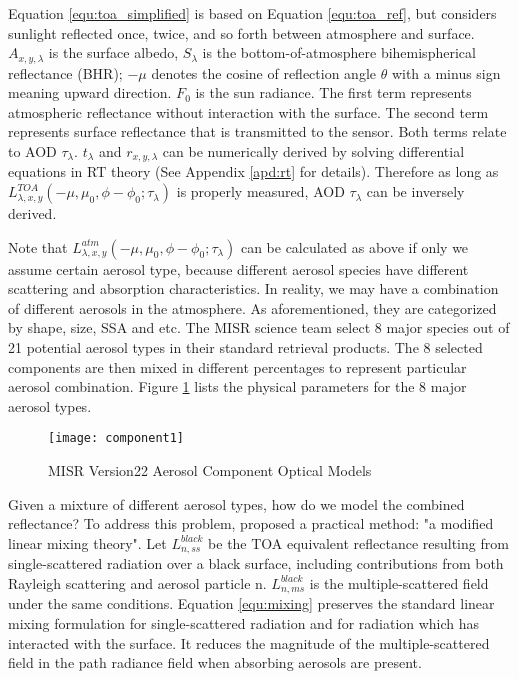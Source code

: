 Equation \eqref{equ:toa_simplified} is based on Equation \eqref{equ:toa_ref}, but considers sunlight reflected once, twice, and so forth between atmosphere and surface. $A_{x,y,\lambda}$ is the surface albedo, $S_\lambda$ is the bottom-of-atmosphere bihemispherical reflectance (BHR); $-\mu$ denotes the cosine of reflection angle $\theta$ with a minus sign meaning upward direction. $F_0$ is the sun radiance. The first term represents atmospheric reflectance without interaction with the surface. The second term represents surface reflectance that is transmitted to the sensor. Both terms relate to AOD $\tau_\lambda$. $t_{\lambda}$ and $r_{x,y,\lambda}$ can be numerically derived by solving differential equations in RT theory (See Appendix \ref{apd:rt} for details). Therefore as long as $L^{TOA}_{\lambda,x,y}(-\mu,\mu_0,\phi-\phi_0;\tau_\lambda)$ is properly measured, AOD $\tau_\lambda$ can be inversely derived.

Note that $L^{atm}_{\lambda,x,y}(-\mu,\mu_0,\phi-\phi_0;\tau_\lambda)$ can be calculated as above if only we assume certain aerosol type, because different aerosol species have different scattering and absorption characteristics. In reality, we may have a combination of different aerosols in the atmosphere. As aforementioned, they are categorized by shape, size, SSA and etc. The MISR science team select 8 major species out of 21 potential aerosol types in their standard retrieval products. The 8 selected components are then mixed in different percentages to represent particular aerosol combination. Figure \ref{fig:component2} lists the physical parameters for the 8 major aerosol types.

\begin{figure}[h!]
    \centering
    \texttt{[image: component1]}
    \caption{MISR Version22 Aerosol Component Optical Models \cite{kahn2015}}
    \label{fig:component2}
\end{figure}


Given a mixture of different aerosol types, how do we model the combined reflectance? To address this problem, \cite{abdou1997} proposed a practical method: "a modified linear mixing theory". Let $L_{n,ss}^{black}$ be the TOA equivalent reflectance resulting from single-scattered radiation over a black surface, including contributions from both Rayleigh scattering and aerosol particle n. $L_{n,ms}^{black}$ is the multiple-scattered field under the same conditions. Equation \eqref{equ:mixing} preserves the standard linear mixing formulation for single-scattered radiation and for radiation which has interacted with the surface. It reduces the magnitude of the multiple-scattered field in the path radiance field when absorbing aerosols are present.

